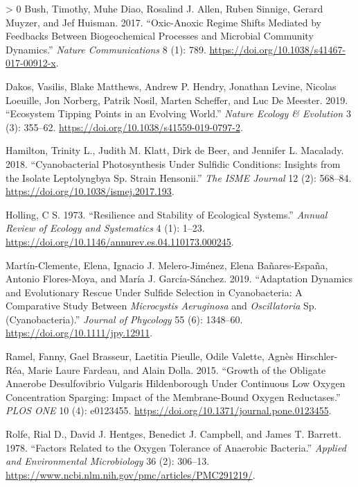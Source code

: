 \documentclass{article}
\newlength{\cslhangindent}
\newenvironment{CSLReferences}[3] %
 {%
  \setlength{\parindent}{0pt}
  \ifodd #1 \everypar{\setlength{\hangindent}{\cslhangindent}}\ignorespaces\fi
  \ifnum #2 > 0
  \setlength{\parskip}{#2\baselineskip}
  \fi
 }%
 {}
\begin{document}
\hypertarget{refs}{}
\begin{CSLReferences}{1}{0}
\leavevmode\hypertarget{ref-bush2017}{}%
Bush, Timothy, Muhe Diao, Rosalind J. Allen, Ruben Sinnige, Gerard
Muyzer, and Jef Huisman. 2017. {``Oxic-Anoxic Regime Shifts Mediated by
Feedbacks Between Biogeochemical Processes and Microbial Community
Dynamics.''} \emph{Nature Communications} 8 (1): 789.
\url{https://doi.org/10.1038/s41467-017-00912-x}.

\leavevmode\hypertarget{ref-dakos2019b}{}%
Dakos, Vasilis, Blake Matthews, Andrew P. Hendry, Jonathan Levine,
Nicolas Loeuille, Jon Norberg, Patrik Nosil, Marten Scheffer, and Luc De
Meester. 2019. {``Ecosystem Tipping Points in an Evolving World.''}
\emph{Nature Ecology \& Evolution} 3 (3): 355--62.
\url{https://doi.org/10.1038/s41559-019-0797-2}.

\leavevmode\hypertarget{ref-hamilton2018}{}%
Hamilton, Trinity L., Judith M. Klatt, Dirk de Beer, and Jennifer L.
Macalady. 2018. {``Cyanobacterial Photosynthesis Under Sulfidic
Conditions: Insights from the Isolate Leptolyngbya Sp. Strain
Hensonii.''} \emph{The ISME Journal} 12 (2): 568--84.
\url{https://doi.org/10.1038/ismej.2017.193}.

\leavevmode\hypertarget{ref-holling1973}{}%
Holling, C S. 1973. {``Resilience and Stability of Ecological
Systems.''} \emph{Annual Review of Ecology and Systematics} 4 (1):
1--23. \url{https://doi.org/10.1146/annurev.es.04.110173.000245}.

\leavevmode\hypertarget{ref-martuxednclemente2019}{}%
Martín-Clemente, Elena, Ignacio J. Melero-Jiménez, Elena Bañares-España,
Antonio Flores-Moya, and María J. García-Sánchez. 2019. {``Adaptation
Dynamics and Evolutionary Rescue Under Sulfide Selection in
Cyanobacteria: A Comparative Study Between {\emph{Microcystis
Aeruginosa}} and {\emph{Oscillatoria}} Sp. (Cyanobacteria).''}
\emph{Journal of Phycology} 55 (6): 1348--60.
\url{https://doi.org/10.1111/jpy.12911}.

\leavevmode\hypertarget{ref-ramel2015}{}%
Ramel, Fanny, Gael Brasseur, Laetitia Pieulle, Odile Valette, Agnès
Hirschler-Réa, Marie Laure Fardeau, and Alain Dolla. 2015. {``Growth of
the Obligate Anaerobe Desulfovibrio Vulgaris Hildenborough Under
Continuous Low Oxygen Concentration Sparging: Impact of the
Membrane-Bound Oxygen Reductases.''} \emph{PLOS ONE} 10 (4): e0123455.
\url{https://doi.org/10.1371/journal.pone.0123455}.

\leavevmode\hypertarget{ref-rolfe1978}{}%
Rolfe, Rial D., David J. Hentges, Benedict J. Campbell, and James T.
Barrett. 1978. {``Factors Related to the Oxygen Tolerance of Anaerobic
Bacteria.''} \emph{Applied and Environmental Microbiology} 36 (2):
306--13. \url{https://www.ncbi.nlm.nih.gov/pmc/articles/PMC291219/}.


\end{CSLReferences}
\end{document}
